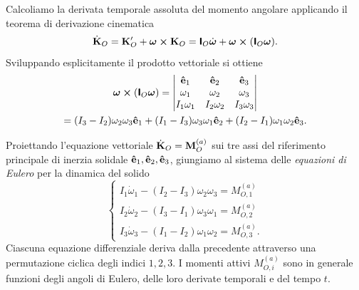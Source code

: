 Calcoliamo la derivata temporale assoluta del momento angolare applicando il teorema di derivazione cinematica
\begin{equation*}
    \dot{\vb{K}}_O = \vb{K}_O' + \vb*{\omega} \cross \vb{K}_O = \boldsymbol{\mathsf{I}}_O \dot{\vb*{\omega}} + \vb*{\omega} \cross (\boldsymbol{\mathsf{I}}_O \vb*{\omega}).
\end{equation*}
Sviluppando esplicitamente il prodotto vettoriale si ottiene
\begin{multline*}
    \vb*{\omega} \cross (\boldsymbol{\mathsf{I}}_O \vb*{\omega}) = \begin{vmatrix}
        \vu{e}_1 & \vu{e}_2 & \vu{e}_3 \\
        \omega_1 & \omega_2 & \omega_3 \\
        I_1 \omega_1 & I_2 \omega_2 & I_3 \omega_3
    \end{vmatrix} \\
    = (I_3 - I_2) \omega_2 \omega_3 \vu{e}_1 + (I_1 - I_3) \omega_3 \omega_1 \vu{e}_2 + (I_2 - I_1) \omega_1 \omega_2 \vu{e}_3.
\end{multline*}

Proiettando l'equazione vettoriale $\dot{\vb{K}}_O = \vb{M}_O^{(a)}$ sui tre assi del riferimento principale di inerzia solidale $\vu{e}_1, \vu{e}_2, \vu{e}_3$, giungiamo al sistema delle \emph{equazioni di Eulero} per la dinamica del solido
\begin{equation}
    \label{eq:equazioni_eulero_solido}
    \begin{cases}
        I_1 \dot{\omega}_1 - (I_2 - I_3) \omega_2 \omega_3 = M_{O,1}^{(a)} \\[0.5em]
        I_2 \dot{\omega}_2 - (I_3 - I_1) \omega_3 \omega_1 = M_{O,2}^{(a)} \\[0.5em]
        I_3 \dot{\omega}_3 - (I_1 - I_2) \omega_1 \omega_2 = M_{O,3}^{(a)}.
    \end{cases}
\end{equation}
Ciascuna equazione differenziale deriva dalla precedente attraverso una permutazione ciclica degli indici $1, 2, 3$. I momenti attivi $M_{O,i}^{(a)}$ sono in generale funzioni degli angoli di Eulero, delle loro derivate temporali e del tempo $t$.

